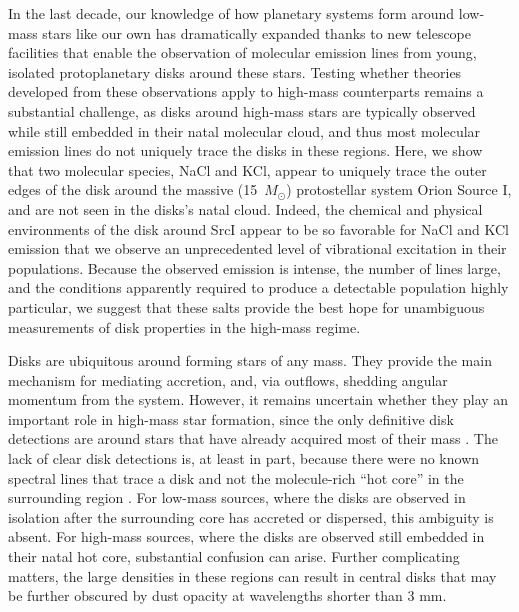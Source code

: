 \documentclass[12pt]{article}
\newcommand{\bam}[1]{\textcolor{green!65!black}{\textbf{[BAM: #1]}}}
\newcommand{\sourcei}{SrcI\xspace}
\newcommand{\msun}{\ensuremath{M_{\odot}}\xspace}			%
\begin{document}
 In the last decade, our knowledge of how planetary systems form around low-mass stars like our own has dramatically expanded thanks to new telescope facilities that enable the observation of molecular emission lines from young, isolated protoplanetary disks around these stars.  Testing whether theories developed from these observations apply to high-mass counterparts remains a substantial challenge, as disks around high-mass stars are typically observed while still embedded in their natal molecular cloud, and thus most molecular emission lines do not uniquely trace the disks in these regions. Here, we show that two molecular species, NaCl and KCl, appear to uniquely trace the outer edges of the disk around the massive (15~\msun) protostellar system Orion Source I, and are not seen in the disks's natal cloud.  Indeed, the chemical and physical environments of the disk around \sourcei appear to be so favorable for NaCl and KCl emission that we observe an unprecedented level of vibrational excitation in their populations.  Because the observed emission is intense, the number of lines large, and the conditions apparently required to produce a detectable population highly particular, we suggest that these salts provide the best hope for unambiguous measurements of disk properties in the high-mass regime. %

Disks are ubiquitous around forming stars of any mass.  They provide the main mechanism for mediating accretion, and, via outflows, shedding angular momentum from the system.  However, it remains uncertain whether they play an important role in high-mass star formation, since the only definitive disk detections are around stars that have already acquired most of their mass \cite{Girart2017a,Ginsburg2018b}.  The lack of clear disk detections is, at least in part, because there were no known spectral lines that trace a disk and not the molecule-rich ``hot core'' in the surrounding region \cite{Goddi2018a,Cesaroni2017a}.  For low-mass sources, where the disks are observed in isolation after the surrounding core has accreted or dispersed, this ambiguity is absent.  For high-mass sources, where the disks are observed still embedded in their natal hot core, substantial confusion can arise. Further complicating matters, the large densities in these regions can result in central disks that may be further obscured by dust opacity at wavelengths shorter than 3 mm.
\end{document}

